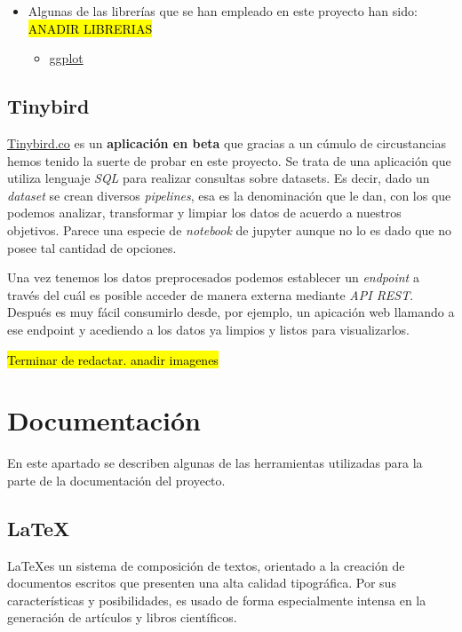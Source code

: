    \begin{itemize}
		\item Algunas de las librerías que se han empleado en este proyecto han sido:
		 \hl{ANADIR LIBRERIAS}
  	\begin{itemize}
  		\item \href{https://www.qlik.com/us}{ggplot} 
  	\end{itemize}
  \end{itemize}
  

 \subsection{Tinybird}
\href{https://tinybird.co//}{Tinybird.co} es un \textbf{aplicación en beta} que gracias a un cúmulo de circustancias hemos tenido la suerte de probar en este proyecto. Se trata de una aplicación que utiliza lenguaje \textit{SQL} para realizar consultas sobre datasets. Es decir, dado un \textit{dataset} se crean diversos \textit{pipelines}, esa es la denominación que le dan, con los que podemos analizar, transformar y limpiar los datos de acuerdo a nuestros objetivos. Parece una especie de \textit{notebook} de jupyter aunque no lo es dado que no posee tal cantidad de opciones. 

Una vez tenemos los datos preprocesados podemos establecer un \textit{endpoint} a través del cuál es posible acceder de manera externa mediante \textit{API REST}. Después es muy fácil consumirlo desde, por ejemplo, un apicación web llamando a ese endpoint y acediendo a los datos ya limpios y listos para visualizarlos. 

 \hl{Terminar de redactar. anadir imagenes}

\section{Documentación}\label{docs}
En este apartado se describen algunas de las herramientas utilizadas para la parte de la documentación del proyecto.

 \subsection{La\TeX}\label{docs_latex}
  La\TeX es un sistema de composición de textos, orientado a la creación de documentos escritos que presenten una alta calidad tipográfica. Por sus características y posibilidades, es usado de forma especialmente intensa en la generación de artículos y libros científicos. 
  
